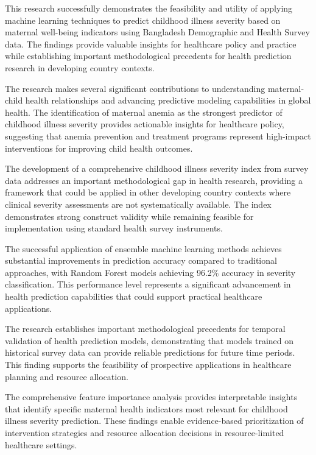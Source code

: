 \documentclass[12pt]{report}
\begin{document}
This research successfully demonstrates the feasibility and utility of applying machine learning techniques to predict childhood illness severity based on maternal well-being indicators using Bangladesh Demographic and Health Survey data. The findings provide valuable insights for healthcare policy and practice while establishing important methodological precedents for health prediction research in developing country contexts.

The research makes several significant contributions to understanding maternal-child health relationships and advancing predictive modeling capabilities in global health. The identification of maternal anemia as the strongest predictor of childhood illness severity provides actionable insights for healthcare policy, suggesting that anemia prevention and treatment programs represent high-impact interventions for improving child health outcomes.

The development of a comprehensive childhood illness severity index from survey data addresses an important methodological gap in health research, providing a framework that could be applied in other developing country contexts where clinical severity assessments are not systematically available. The index demonstrates strong construct validity while remaining feasible for implementation using standard health survey instruments.

The successful application of ensemble machine learning methods achieves substantial improvements in prediction accuracy compared to traditional approaches, with Random Forest models achieving 96.2\% accuracy in severity classification. This performance level represents a significant advancement in health prediction capabilities that could support practical healthcare applications.

The research establishes important methodological precedents for temporal validation of health prediction models, demonstrating that models trained on historical survey data can provide reliable predictions for future time periods. This finding supports the feasibility of prospective applications in healthcare planning and resource allocation.

The comprehensive feature importance analysis provides interpretable insights that identify specific maternal health indicators most relevant for childhood illness severity prediction. These findings enable evidence-based prioritization of intervention strategies and resource allocation decisions in resource-limited healthcare settings.
\end{document}
